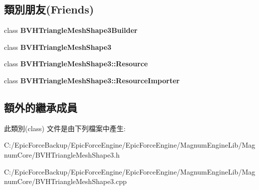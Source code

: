 \subsection*{類別朋友(Friends)}
\begin{DoxyCompactItemize}
\item 
class {\bfseries B\+V\+H\+Triangle\+Mesh\+Shape3\+Builder}\hypertarget{class_magnum_1_1_b_v_h_triangle_mesh_shape3_1_1_resource_importer_a0f649365ade947ac32bf9c7a71b53fef}{}\label{class_magnum_1_1_b_v_h_triangle_mesh_shape3_1_1_resource_importer_a0f649365ade947ac32bf9c7a71b53fef}

\item 
class {\bfseries B\+V\+H\+Triangle\+Mesh\+Shape3}\hypertarget{class_magnum_1_1_b_v_h_triangle_mesh_shape3_1_1_resource_importer_a7d93684b283f743d08e2f2bd03a8bbec}{}\label{class_magnum_1_1_b_v_h_triangle_mesh_shape3_1_1_resource_importer_a7d93684b283f743d08e2f2bd03a8bbec}

\item 
class {\bfseries B\+V\+H\+Triangle\+Mesh\+Shape3\+::\+Resource}\hypertarget{class_magnum_1_1_b_v_h_triangle_mesh_shape3_1_1_resource_importer_ac4877a9b420bd82dfa94ecb349aaf30c}{}\label{class_magnum_1_1_b_v_h_triangle_mesh_shape3_1_1_resource_importer_ac4877a9b420bd82dfa94ecb349aaf30c}

\item 
class {\bfseries B\+V\+H\+Triangle\+Mesh\+Shape3\+::\+Resource\+Importer}\hypertarget{class_magnum_1_1_b_v_h_triangle_mesh_shape3_1_1_resource_importer_a4cabc043c009b59e57956377e8726767}{}\label{class_magnum_1_1_b_v_h_triangle_mesh_shape3_1_1_resource_importer_a4cabc043c009b59e57956377e8726767}

\end{DoxyCompactItemize}
\subsection*{額外的繼承成員}


此類別(class) 文件是由下列檔案中產生\+:\begin{DoxyCompactItemize}
\item 
C\+:/\+Epic\+Force\+Backup/\+Epic\+Force\+Engine/\+Epic\+Force\+Engine/\+Magnum\+Engine\+Lib/\+Magnum\+Core/B\+V\+H\+Triangle\+Mesh\+Shape3.\+h\item 
C\+:/\+Epic\+Force\+Backup/\+Epic\+Force\+Engine/\+Epic\+Force\+Engine/\+Magnum\+Engine\+Lib/\+Magnum\+Core/B\+V\+H\+Triangle\+Mesh\+Shape3.\+cpp\end{DoxyCompactItemize}
